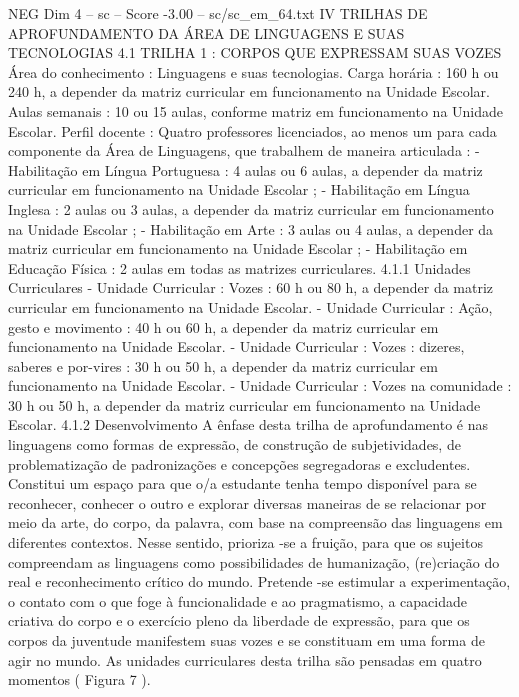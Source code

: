 \begin{textsample}{NEG Dim 4 – sc – Score -3.00 – sc/sc\_em\_64.txt}  \label{ex:f4_neg_253}
IV TRILHAS DE APROFUNDAMENTO DA ÁREA DE LINGUAGENS E SUAS TECNOLOGIAS 4.1 TRILHA 1 : CORPOS QUE EXPRESSAM SUAS VOZES Área do conhecimento : Linguagens e suas tecnologias.
Carga horária : 160 h ou 240 h, a depender da matriz curricular em funcionamento na Unidade Escolar.
Aulas semanais : 10 ou 15 aulas, conforme matriz em funcionamento na Unidade Escolar.
Perfil docente : Quatro professores licenciados, ao menos um para cada componente da Área de Linguagens, que trabalhem de maneira articulada : - Habilitação em Língua Portuguesa : 4 aulas ou 6 aulas, a depender da matriz curricular em funcionamento na Unidade Escolar ; - Habilitação em Língua Inglesa : 2 aulas ou 3 aulas, a depender da matriz curricular em funcionamento na Unidade Escolar ; - Habilitação em Arte : 3 aulas ou 4 aulas, a depender da matriz curricular em funcionamento na Unidade Escolar ; - Habilitação em Educação Física : 2 aulas em todas as matrizes curriculares. 4.1.1 Unidades Curriculares - Unidade Curricular : Vozes : 60 h ou 80 h, a depender da matriz curricular em funcionamento na Unidade Escolar. - Unidade Curricular : Ação, gesto e movimento : 40 h ou 60 h, a depender da matriz curricular em funcionamento na Unidade Escolar. - Unidade Curricular : Vozes : dizeres, saberes e por-vires : 30 h ou 50 h, a depender da matriz curricular em funcionamento na Unidade Escolar. - Unidade Curricular : Vozes na comunidade : 30 h ou 50 h, a depender da matriz curricular em funcionamento na Unidade Escolar. 4.1.2 Desenvolvimento A ênfase desta trilha de aprofundamento é nas linguagens como formas de expressão, de construção de subjetividades, de problematização de padronizações e concepções segregadoras e excludentes.
Constitui um espaço para que o/a estudante tenha tempo disponível para se reconhecer, conhecer o outro e explorar diversas maneiras de se relacionar por meio da arte, do corpo, da palavra, com base na compreensão das linguagens em diferentes contextos.
Nesse sentido, prioriza -se a fruição, para que os sujeitos compreendam as linguagens como possibilidades de humanização, (re)criação do real e reconhecimento crítico do mundo.
Pretende -se estimular a experimentação, o contato com o que foge à funcionalidade e ao pragmatismo, a capacidade criativa do corpo e o exercício pleno da liberdade de expressão, para que os corpos da juventude manifestem suas vozes e se constituam em uma forma de agir no mundo.
As unidades curriculares desta trilha são pensadas em quatro momentos ( Figura 7 ).

\end{textsample}
